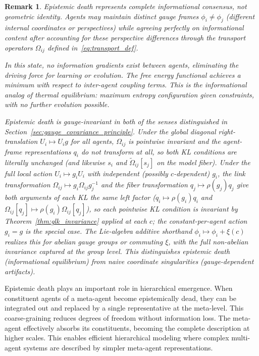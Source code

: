 \documentclass[11pt]{article}
\newtheorem{remark}{Remark}
\begin{document}
\begin{remark}
Epistemic death represents complete informational consensus, not geometric identity. Agents may maintain distinct gauge frames $\phi_i \neq \phi_j$ (different internal coordinates or perspectives) while agreeing perfectly on informational content after accounting for these perspective differences through the transport operators $\Omega_{ij}$ defined in~\eqref{eq:transport_def}.

In this state, no information gradients exist between agents, eliminating the driving force for learning or evolution. The free energy functional achieves a minimum with respect to inter-agent coupling terms. This is the informational analog of thermal equilibrium: maximum entropy configuration given constraints, with no further evolution possible.

Epistemic death is gauge-invariant in both of the senses distinguished in Section~\ref{sec:gauge_covariance_principle}. Under the global diagonal right-translation $U_i \mapsto U_i g$ for all agents, $\Omega_{ij}$ is pointwise invariant and the agent-frame representations $q_i$ do not transform at all, so both KL conditions are literally unchanged (and likewise $s_i$ and $\tilde{\Omega}_{ij}[s_j]$ on the model fiber). Under the full local action $U_i \mapsto g_iU_i$ with independent (possibly $c$-dependent) $g_i$, the link transformation $\Omega_{ij} \mapsto g_i\Omega_{ij}g_j^{-1}$ and the fiber transformation $q_j \mapsto \rho(g_j)q_j$ give both arguments of each KL the same left factor ($q_i \mapsto \rho(g_i)q_i$ and $\Omega_{ij}[q_j] \mapsto \rho(g_i)\Omega_{ij}[q_j]$), so each pointwise KL condition is invariant by Theorem~\ref{thm:glk_invariance} applied at each $c$; the constant-per-agent action $g_i = g$ is the special case. The Lie-algebra additive shorthand $\phi_i \mapsto \phi_i + \xi(c)$ realizes this for abelian gauge groups or commuting $\xi$, with the full non-abelian invariance captured at the group level. This distinguishes epistemic death (informational equilibrium) from naive coordinate singularities (gauge-dependent artifacts).
\end{remark}

Epistemic death plays an important role in hierarchical emergence. When constituent agents of a meta-agent become epistemically dead, they can be integrated out and replaced by a single representative at the meta-level. This coarse-graining reduces degrees of freedom without information loss. The meta-agent effectively absorbs its constituents, becoming the complete description at higher scales. This enables efficient hierarchical modeling where complex multi-agent systems are described by simpler meta-agent representations.
\end{document}
